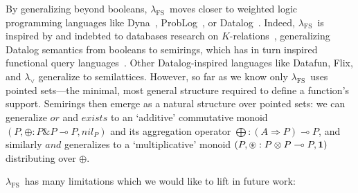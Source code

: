 \documentclass[runningheads]{llncs}
\newcommand\strong[1]{{\bfseries#1}}
\newcommand\todo[1]{{\color{IndianRed}#1}}
\newcommand\TODO[1]{\todo{\strong{TODO}: #1}}
\newcommand\xxx{\text{\todo{\strong{XXX}}}}
\newcommand\todolater\todo
\renewcommand\todolater[1]{\todo{\color{RoyalBlue}#1}}
\renewcommand\todo[1]{\ignorespaces}\renewcommand\xxx{\text{\color{IndianRed}\strong{XXX}}}
\newcommand\fslang{\ensuremath{\lambda_{\mathrm{FS}}}}
\newcommand\name[1]{\ensuremath{\mathit{#1}}}
\newcommand\<\:                 %
\newcommand\lto\multimap        %
\newcommand\fto\Rightarrow
\newcommand\with{\mathbin{\&}}
\newcommand\nil{\name{nil}}
\begin{document}
By generalizing beyond booleans, \fslang\ moves closer to weighted logic programming languages like Dyna~\cite{filardo:dyna2,matthewfl:thesis}, ProbLog~\cite{DBLP:conf/ijcai/RaedtKT07}, or Datalog\textdegree~\cite{DBLP:journals/jacm/KhamisNPSW24}.
Indeed, \fslang\ is inspired by and indebted to databases research on $K$-relations~\cite{DBLP:conf/pods/GreenKT07}, generalizing Datalog semantics from booleans to semirings, which has in turn inspired functional query languages~\cite{DBLP:journals/corr/abs-2207-00850,DBLP:journals/pacmpl/ShaikhhaHSO22}.
Other Datalog-inspired languages like Datafun, Flix, and $\lambda_\vee$ generalize to semilattices.
However, so far as we know only \fslang\ uses {pointed sets}---the minimal, most general structure required to define a function's support.
Semirings then emerge as a natural structure over pointed sets:
we can generalize \name{or} and \name{exists} to an `additive' commutative monoid $(P, {\oplus} : P \with P \lto P, \nil_P)$ and its aggregation operator $\bigoplus : (A \fto P) \lto P$, and similarly \name{and} generalizes to a `multiplicative' monoid $(P, {\oast} : P \otimes P \lto P, \boldsymbol 1)$ distributing over $\oplus$.

\TODO{discuss connection between my work and Morel's ``predicate inversion''?}

\todolater{Discuss input/output modes.
  Cite Mercury, Mistral Contrastin~\cite{DBLP:conf/ppdp/ContrastinOR18}, and Ariadne Si Suo's paper with Neel K (unpublished!).
  This idea is latent in languages like Datafun, Flix, and $\lambda_\vee$ that separate procedural functions from logical predicates.
  But, although we have barely discussed it in this paper, our observation that grounding corresponds to a effect graded by the set of grounded variables seems novel (so far as we know).
}



\fslang\ has many limitations which we would like to lift in future work:
\end{document}
